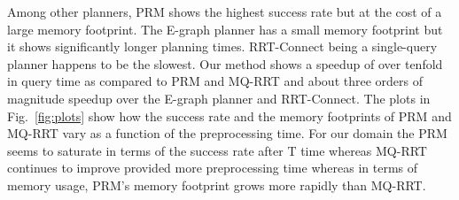 \documentclass[letterpaper]{article} %
\begin{document}
Among other planners, \textsf{PRM} shows the highest success rate but at the cost of a large memory footprint. The \textsf{E-graph} planner has a small memory footprint but it shows significantly longer planning times. \textsf{RRT-Connect} being a single-query planner happens to be the slowest. Our method shows a speedup of over tenfold in query time as compared to \textsf{PRM} and \textsf{MQ-RRT} and about three orders of magnitude speedup over the \textsf{E-graph} planner and \textsf{RRT-Connect}. The plots in Fig.~\ref{fig:plots} show how the success rate and the memory footprints of \textsf{PRM} and \textsf{MQ-RRT} vary as a function of the preprocessing time. For our domain the \textsf{PRM} seems to saturate in terms of the success rate after T time whereas \textsf{MQ-RRT} continues to improve provided more preprocessing time whereas in terms of memory usage, \textsf{PRM}'s memory footprint grows more rapidly than \textsf{MQ-RRT}.
\end{document}
